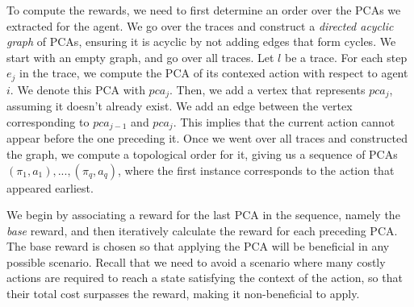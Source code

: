 {To compute the rewards, we need to first determine an order over the PCAs we extracted for the agent.
We go over the traces and construct a \emph{directed acyclic graph} of PCAs, ensuring it is acyclic by not adding edges that form cycles.
We start with an empty graph, and go over all traces. Let $l$ be a trace.
For each step $e_j$ in the trace, we compute the PCA of its contexed action with respect to agent $i$. We denote this PCA with $pca_j$.
Then, we add a vertex that represents $pca_j$, assuming it doesn't already exist. We add an edge between the vertex corresponding to $pca_{j-1}$ and $pca_j$.
This implies that the current action cannot appear before the one preceding it.
Once we went over all traces and constructed the graph, we compute a topological order
for it, giving us a sequence of PCAs $(\pi_1, a_1),..., (\pi_q, a_q)$, where the first instance corresponds to the action that appeared earliest.

We begin by associating a reward for the last PCA in the sequence, namely the \emph{base} reward, and then iteratively calculate the reward for each preceding PCA.
The base reward is chosen so that applying the PCA will be beneficial in any possible scenario. Recall that we need to avoid a scenario where many costly actions are required to reach a state satisfying the context of the action, so that their total cost surpasses the reward, making it non-beneficial to apply.



}
